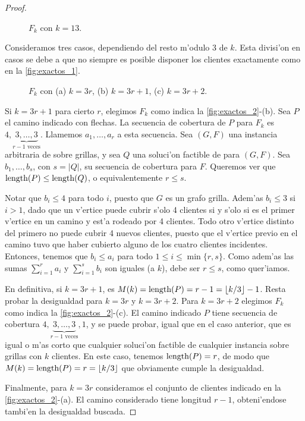 \begin{theorem}
\begin{proof}
\begin{figure}[h]
	\begin{center}
		
	\end{center}		
	\caption{$F_k$ con $k = 13$.}
	\label{fig:exactos_1}
\end{figure}

Consideramos tres casos, dependiendo del resto m'odulo 3 de $k$. Esta divisi'on en casos se debe a que no siempre es posible disponer los clientes exactamente como en la \autoref{fig:exactos_1}.

\begin{figure}[h]
	\begin{center}
		
	\end{center}		
	\caption{$F_k$ con (a) $k = 3r$, (b) $k = 3r + 1$, (c) $k = 3r + 2$.}
	\label{fig:exactos_2}
\end{figure}

Si $k = 3r + 1$ para cierto $r$, elegimos $F_k$ como indica la \autoref{fig:exactos_2}-(b). Sea $P$ el camino indicado con flechas. La secuencia de cobertura de $P$ para $F_k$ es $4, \underbrace{3, \dots, 3}_{r - 1 \text{ veces}}$. Llamemos $a_1, \dots, a_r$ a esta secuencia. Sea $(G, F)$ una instancia arbitraria de  sobre grillas, y sea $Q$ una soluci'on factible de  para $(G, F)$. Sea $b_1, \dots, b_s$, con $s = |Q|$, su secuencia de cobertura para $F$. Queremos ver que $\textnormal{length}(P) \leq \textnormal{length}(Q)$, o equivalentemente $r \leq s$.

Notar que $b_i \leq 4$ para todo $i$, puesto que $G$ es un grafo grilla. Adem'as $b_i \leq 3$ si $i > 1$, dado que un v'ertice puede cubrir s'olo 4 clientes si y s'olo si es el primer v'ertice en un camino y est'a rodeado por 4 clientes. Todo otro v'ertice distinto del primero no puede cubrir 4 nuevos clientes, puesto que el v'ertice previo en el camino tuvo que haber cubierto alguno de los cuatro clientes incidentes. Entonces, tenemos que $b_i \leq a_i$ para todo $1 \leq i \leq \min\{r, s\}$. Como adem'as las sumas $\sum_{i = 1}^r a_i$ y $\sum_{i = 1}^s b_i$ son iguales (a $k$), debe ser $r \leq s$, como quer'iamos.

En definitiva, si $k = 3r + 1$, es $M(k) = \textnormal{length}(P) = r - 1 = \left\lfloor k / 3 \right\rfloor - 1$. Resta probar la desigualdad para $k = 3r$ y $k = 3r + 2$. Para $k = 3r + 2$ elegimos $F_k$ como indica la \autoref{fig:exactos_2}-(c). El camino indicado $P$ tiene secuencia de cobertura $4, \underbrace{3, \dots, 3}_{r - 1\text{ veces}}, 1$, y se puede probar, igual que en el caso anterior, que es igual o m'as corto que cualquier soluci'on factible de cualquier instancia sobre grillas con $k$ clientes. En este caso, tenemos $\textnormal{length}(P) = r$, de modo que $M(k) = \textnormal{length}(P) = r = \left\lfloor k / 3 \right\rfloor$ que obviamente cumple la desigualdad.

Finalmente, para $k = 3r$ consideramos el conjunto de clientes indicado en la \autoref{fig:exactos_2}-(a). El camino considerado tiene longitud $r - 1$, obteni'endose tambi'en la desigualdad buscada.
\end{proof}
\end{theorem}

